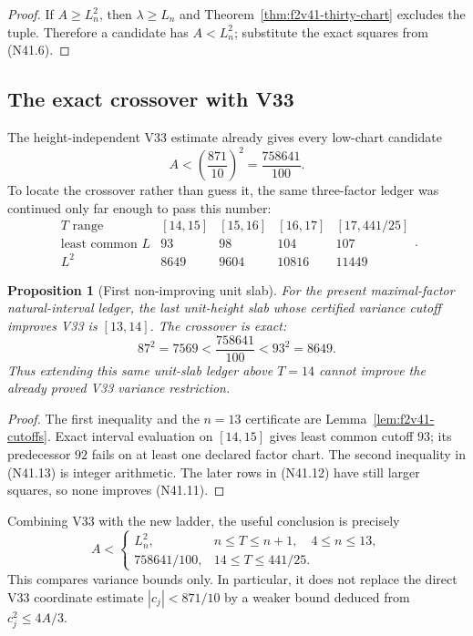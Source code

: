\documentclass[11pt]{article}
\newtheorem{proposition}[theorem]{Proposition}
\theoremstyle{definition}
\theoremstyle{remark}
\begin{document}
\begin{proof}
If \(A\geq L_n^2\), then \(\lambda\geq L_n\) and
Theorem~\ref{thm:f2v41-thirty-chart} excludes the tuple.  Therefore a
candidate has \(A<L_n^2\); substitute the exact squares from
\textup{(N41.6)}.
\end{proof}

\subsection{The exact crossover with V33}

The height-independent V33 estimate already gives every low-chart
candidate
\[
 A<\left(\frac{871}{10}\right)^2
 =\frac{758641}{100}.
\tag{N41.11}
\]
To locate the crossover rather than guess it, the same three-factor
ledger was continued only far enough to pass this number:
\[
\begin{array}{c|rrrr}
T\text{ range}&{}[14,15]&{}[15,16]&{}[16,17]&{}[17,441/25]\\ \hline
\text{least common }L&93&98&104&107\\
L^2&8649&9604&10816&11449
\end{array}.
\tag{N41.12}
\]

\begin{proposition}[First non-improving unit slab]
\label{prop:f2v41-crossover}
For the present maximal-factor natural-interval ledger, the last
unit-height slab whose certified variance cutoff improves V33 is
\([13,14]\).  The crossover is exact:
\[
 87^2=7569
 <\frac{758641}{100}
 <93^2=8649.
\tag{N41.13}
\]
Thus extending this same unit-slab ledger above \(T=14\) cannot improve
the already proved V33 variance restriction.
\end{proposition}

\begin{proof}
The first inequality and the \(n=13\) certificate are
Lemma~\ref{lem:f2v41-cutoffs}.  Exact interval evaluation on
\([14,15]\) gives least common cutoff \(93\); its predecessor \(92\)
fails on at least one declared factor chart.  The second inequality in
\textup{(N41.13)} is integer arithmetic.  The later rows in
\textup{(N41.12)} have still larger squares, so none improves
\textup{(N41.11)}.
\end{proof}

Combining V33 with the new ladder, the useful conclusion is precisely
\[
 A<
 \begin{cases}
 L_n^2,&n\leq T\leq n+1,\quad4\leq n\leq13,\\
 758641/100,&14\leq T\leq441/25.
 \end{cases}
\tag{N41.14}
\]
This compares variance bounds only.  In particular, it does not replace
the direct V33 coordinate estimate \(|c_j|<871/10\) by a weaker bound
deduced from \(c_j^2\leq4A/3\).
\end{document}
